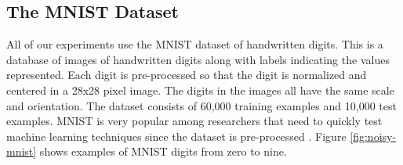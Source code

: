 \subsection{The MNIST Dataset} \label{sec:theory-approach-the-mnist-dataset}

All of our experiments use the MNIST dataset of handwritten digits. This is a database of images of handwritten digits along with labels indicating the values represented. Each digit is pre-processed so that the digit is normalized and centered in a 28x28 pixel image. The digits in the images all have the same scale and orientation. The dataset consists of 60,000 training examples and 10,000 test examples. MNIST is very popular among researchers that need to quickly test machine learning techniques since the dataset is pre-processed \cite{MNIST}. Figure \ref{fig:noisy-mnist} shows examples of MNIST digits from zero to nine.
